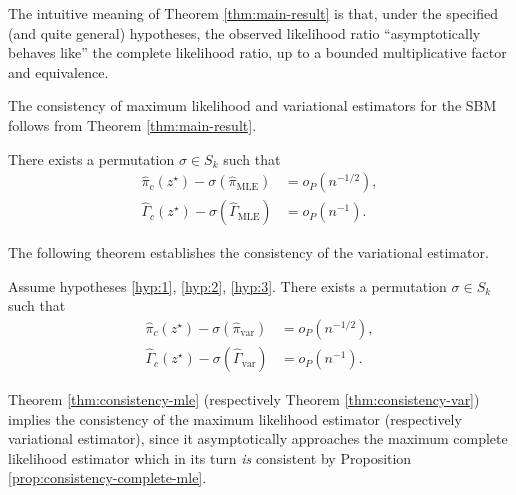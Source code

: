 \documentclass[../../main.tex]{subfiles} %
\begin{document}
\begin{remark}
	The intuitive meaning of Theorem \ref{thm:main-result} is that, under the 
	specified (and quite general) hypotheses, the observed likelihood ratio 
	``asymptotically behaves like'' the complete likelihood ratio, up to a 
	bounded multiplicative factor and equivalence.
\end{remark}

The consistency of maximum likelihood and variational estimators for the SBM 
follows from Theorem \ref{thm:main-result}.
\begin{theorem}
	There exists a permutation \(\sigma \in S_k\) such that
	\begin{equation}
		\begin{aligned}
			\hat \pi_c (z^\star) - \sigma(\hat \pi_{\text{MLE}}) &= o_P (n^{-1/2}), \\
			\hat \Gamma_c (z^\star) - \sigma(\hat \Gamma_{\text{MLE}}) &= o_P 
			(n^{-1}).
		\end{aligned}
	\end{equation}
	\label{thm:consistency-mle}
\end{theorem}

The following theorem establishes the consistency of the variational estimator.
\begin{theorem}
	Assume hypotheses \ref{hyp:1}, \ref{hyp:2}, \ref{hyp:3}. There exists a 
	permutation \(\sigma \in S_k\) such that
	\begin{equation}
		\begin{aligned}
			\hat \pi_c (z^\star) - \sigma(\hat \pi_{\text{var}}) &= o_P (n^{-1/2}), \\
			\hat \Gamma_c (z^\star) - \sigma(\hat \Gamma_{\text{var}}) &= o_P 
			(n^{-1}).
		\end{aligned}
	\end{equation}
	\label{thm:consistency-var}
\end{theorem}

\begin{remark}
	Theorem \ref{thm:consistency-mle} (respectively Theorem 
	\ref{thm:consistency-var}) 
	implies the consistency of the maximum likelihood estimator (respectively 
	variational estimator), since it asymptotically approaches the maximum 
	complete likelihood estimator which in its turn \textit{is} consistent by 
	Proposition \ref{prop:consistency-complete-mle}.
\end{remark}
\end{document}
